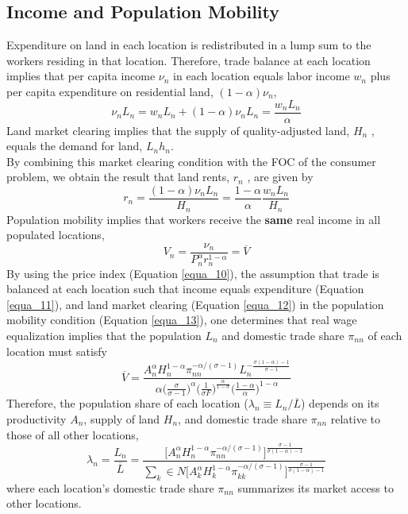 \documentclass[11pt]{article}
\begin{document}
\subsection*{Income and Population Mobility}
Expenditure on land in each location is redistributed in a lump sum to the workers residing in that location. Therefore, trade balance at each location implies that per capita income $\nu_{n}$ in each location equals labor income $w_{n}$ plus per capita expenditure on residential land, $(1 - \alpha )\nu_{n}$,
\begin{equation} \label{equa_11}
\nu_{n} L_{n} = w_{n} L_{n} + (1-\alpha ) \nu_{n} L_{n} = \frac{w_{n} L_{n}}{\alpha }
\end{equation}
Land market clearing implies that the supply of quality-adjusted land, $H_{n}$ , equals the demand for land, $L_{n} h_{n}$.\\
By combining this market clearing condition with the FOC of the consumer problem, we obtain the result that land rents, $r_{n}$ , are given by
\begin{equation} \label{equa_12}
r_{n} = \frac{(1 - \alpha ) \nu_{n} L_{n}}{H_{n}} = \frac{1 - \alpha}{\alpha} \frac{w_{n} L_{n}}{H_{n}}
\end{equation}
Population mobility implies that workers receive the \textbf{same} real income in all populated locations,
\begin{equation} \label{equa_13}
V_{n} = \frac{\nu_{n}}{ P^{\alpha}_{n} r^{1-\alpha}_{n}}  = \overline{V}
\end{equation}
By using the price index (Equation \ref{equa_10}), the assumption that trade is balanced at each location such that income equals expenditure (Equation \ref{equa_11}), and land market clearing (Equation \ref{equa_12}) in the population mobility condition (Equation \ref{equa_13}), one determines that real wage equalization implies that the population $L_{n}$ and domestic trade share $\pi_{nn}$ of each location must satisfy
\begin{equation} \label{equa_14}
\overline{V} = \frac{A^{\alpha}_{n} H^{1-\alpha}_{n} \pi_{nn}^{-\alpha / (\sigma -1)} L_{n}^{-\frac{\sigma (1 - \alpha ) - 1}{\sigma - 1}}}{\alpha \Big( \frac{\sigma}{\sigma - 1} \Big)^{\alpha} \Big( \frac{1}{\sigma F} \Big)^{\frac{\alpha}{1 - \sigma}} \Big( \frac{1 - \alpha}{\alpha} \Big)^{1 - \alpha}}
\end{equation}
Therefore, the population share of each location ($\lambda_{n} \equiv L_{n}/ \overline{L} $) depends on its productivity $A_{n}$, supply of land $H_{n}$, and domestic trade share $\pi_{nn}$ relative to those of all other locations,
\begin{equation} \label{equa_15}
\lambda_{n} = \frac{L_{n}}{\overline{L}} = \frac{\Big[ A^{\alpha}_{n} H_{n}^{1-\alpha} \pi_{nn}^{-\alpha / (\sigma - 1)} \Big]^{\frac{\sigma - 1}{\sigma (1-\alpha )-1}}}{\sum_{k} \in N \Big[ A^{\alpha}_{k} H_{k}^{1-\alpha} \pi_{kk}^{-\alpha / (\sigma - 1)} \Big]^{\frac{\sigma - 1}{\sigma (1-\alpha )-1}}}
\end{equation}
where each location's domestic trade share $\pi_{nn}$ summarizes its market access to other locations.
\end{document}
